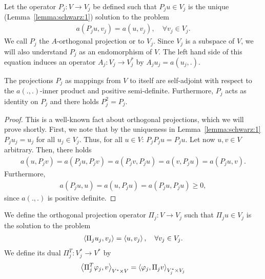 \begin{definition}
  \label{definition:schwarz:1}
  Let the operator $P_j: V \to V_j$ be defined such that $P_j u \in V_j$ is
  the unique (Lemma~\ref{lemma:schwarz:1}) solution to the problem
  \begin{gather}
    \label{eq:schwarz:2}
    a(P_j u,v_j) = a(u,v_j),\quad\forall v_j\in V_j.
  \end{gather}
  We call $P_j$ the $A$-orthogonal projection or  to
  $V_j$. Since $V_j$ is a subspace of $V$, we will also understand $P_j$
  as an endomorphism of $V$.
  The left hand side of this equation induces an operator $A_j:
  V_j \to V_j^*$ by $A_j u_j = a(u_j,.)$.
\end{definition}

\begin{lemma}
  \label{lemma:schwarz:ritz}
  The projections $P_j$ as mappings from $V$ to itself
  are self-adjoint with respect to the
  $a(.,.)$-inner product and positive semi-definite. Furthermore,
  $P_j$ acts as identity on $P_j$ and there holds $P_j^2 = P_j$.
\end{lemma}
\begin{proof}
  This is a well-known fact about orthogonal projections, which we
  will prove shortly.
  First, we note that by the uniqueness in
  Lemma~\ref{lemma:schwarz:1} $P_j u_j = u_j$
  for all $u_j\in V_j$. Thus, for all $u\in V$: $P_j P_j u = P_j u$.
  Let now $u,v\in V$ arbitrary. Then, there holds
  \begin{gather*}
    a(u, P_j v) = a(P_j u, P_j v) = a(P_j v, P_j u)
    = a(v, P_j u) = a(P_j u, v).
  \end{gather*}
  Furthermore,
  \begin{gather*}
    a(P_j u,u) = a(u, P_j u) = a(P_j u, P_j u)\ge 0,
  \end{gather*}
  since $a(.,.)$ is positive definite.
\end{proof}

\begin{definition}
  \label{definition:schwarz:1a}
  We define the orthogonal projection operator
  $\Pi_j: V \to V_j$ such that $\Pi_j u\in V_j$ is the solution to the problem
  \begin{gather}
    \scal(\Pi_j u_j,v_j) = \scal(u,v_j),\quad\forall v_j\in V_j.
  \end{gather}
  We define its dual $\Pi_j^T: V_j^* \to V^*$ by
  \begin{gather}
    \label{eq:schwarz:3}
    \scal(\Pi_j^T \phi_j,v)_{V^*\times V} =  \scal( \phi_j,\Pi_j
    v)_{V_j^*\times V_j}
  \end{gather}
\end{definition}

